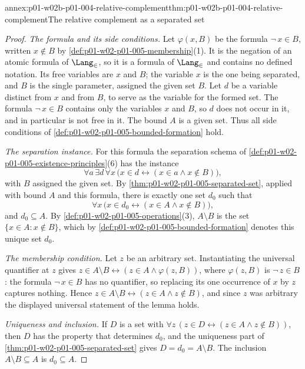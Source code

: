 \begin{annexitem}{annex:p01-w02b-p01-004-relative-complement}{thm:p01-w02b-p01-004-relative-complement}{The relative complement as a separated set}
\begin{proof}
\emph{The formula and its side conditions.} Let \(\varphi(x,B)\) be the formula
\(\neg\,x\in B\), written \(x\notin B\) by
\cref{def:p01-w02-p01-005-membership}(1). It is the negation of an atomic
formula of \(\Lang_{\in}\), so it is a formula of \(\Lang_{\in}\) and contains
no defined notation. Its free variables are \(x\) and \(B\); the variable \(x\)
is the one being separated, and \(B\) is the single parameter, assigned the
given set \(B\). Let \(d\) be a variable distinct from \(x\) and from \(B\), to
serve as the variable for the formed set. The formula \(\neg\,x\in B\) contains
only the variables \(x\) and \(B\), so \(d\) does not occur in it, and in
particular is not free in it. The bound \(A\) is a given set. Thus all side
conditions of \cref{def:p01-w02-p01-005-bounded-formation} hold.

\emph{The separation instance.} For this formula the separation schema of
\cref{def:p01-w02-p01-005-existence-principles}(6) has the instance
\[
  \forall a\,\exists d\,\forall x\,
  \bigl(x\in d\leftrightarrow(x\in a\land x\notin B)\bigr),
\]
with \(B\) assigned the given set. By
\cref{thm:p01-w02-p01-005-separated-set}, applied with bound \(A\) and this
formula, there is exactly one set \(d_0\) such that
\[
  \forall x\,\bigl(x\in d_0\leftrightarrow(x\in A\land x\notin B)\bigr),
\]
and \(d_0\subseteq A\). By \cref{def:p01-w02-p01-005-operations}(3),
\(A\setminus B\) is the set \(\{x\in A:x\notin B\}\), which by
\cref{def:p01-w02-p01-005-bounded-formation} denotes this unique set \(d_0\).

\emph{The membership condition.} Let \(z\) be an arbitrary set. Instantiating
the universal quantifier at \(z\) gives
\(z\in A\setminus B\leftrightarrow(z\in A\land\varphi(z,B))\), where
\(\varphi(z,B)\) is \(\neg\,z\in B\): the formula \(\neg\,x\in B\) has no
quantifier, so replacing its one occurrence of \(x\) by \(z\) captures nothing.
Hence \(z\in A\setminus B\leftrightarrow(z\in A\land z\notin B)\), and since
\(z\) was arbitrary the displayed universal statement of the lemma holds.

\emph{Uniqueness and inclusion.} If \(D\) is a set with
\(\forall z\,(z\in D\leftrightarrow(z\in A\land z\notin B))\), then \(D\) has
the property that determines \(d_0\), and the uniqueness part of
\cref{thm:p01-w02-p01-005-separated-set} gives \(D=d_0=A\setminus B\). The
inclusion \(A\setminus B\subseteq A\) is \(d_0\subseteq A\).
\end{proof}
\end{annexitem}

